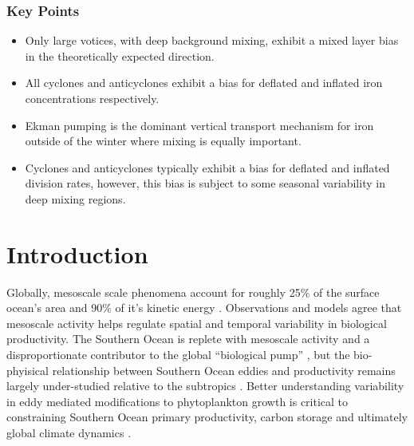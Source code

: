 \documentclass{article}
\begin{document}
\vspace{3mm}
\subsubsection*{Key Points}
\begin{itemize}
\item Only large votices, with deep background mixing, exhibit a mixed layer bias in the theoretically expected direction. 
\item All cyclones and anticyclones exhibit a bias for deflated and inflated iron concentrations respectively. 
\item Ekman pumping is the dominant vertical transport mechanism for iron outside of the winter where mixing is equally important.
\item Cyclones and anticyclones typically exhibit a bias for deflated and inflated division rates, however, this bias is subject to some seasonal variability in deep mixing regions.

\end{itemize}
%

\section{Introduction}

Globally, mesoscale scale phenomena account for roughly 25\% of the surface ocean's area \parencite{ChaigneauEddyactivityfour2009} and 90\% of it's kinetic energy \parencite{FerrariOceanCirculationKinetic2008}. Observations \parencite{LargeModelingParameterizingOcean1998, McGillicuddyEddywindinteractions2007, GaubeSatelliteObservationsMesoscale2014, DoneyMesoscalevariabilitySeaviewing2003, FrengerImprintSouthernOcean2018} and models \parencite{AndersonImpacteddywind2010, SongSeasonalvariationcorrelation2018, Longrolemesoscaleeddies2018} agree that mesoscale activity helps regulate spatial and temporal variability in biological productivity. The Southern Ocean is replete with mesoscale activity \parencite{MeredithMichaelP.Understandingstructurechanges2016, Stevensdistributionkineticenergy1992} and a disproportionate contributor to the global ``biological pump'' \parencite{HauckSouthernOceanCO22015}, but the bio-phyisical relationship between Southern Ocean eddies and productivity remains largely under-studied relative to the subtropics \parencite{SongSeasonalvariationcorrelation2018}.
Better understanding variability in eddy mediated modifications to phytoplankton growth is critical to constraining Southern Ocean primary productivity, carbon storage \parencite{MarinovImpactoceaniccirculation2008} and ultimately global climate dynamics \parencite{ChisholmOceanographyStirringtimes2000}. 
\end{document}
